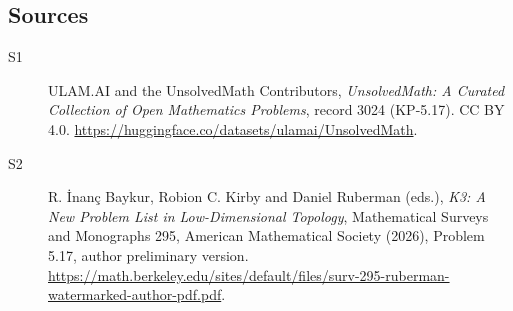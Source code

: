 \documentclass[11pt]{article}
\begin{document}
\subsection{Sources}
\begin{description}
\item[\hypertarget{source:3024:1}{S1}] ULAM.AI and the UnsolvedMath Contributors, \emph{UnsolvedMath: A Curated Collection of Open Mathematics Problems}, record 3024 (KP-5.17). CC BY 4.0. \url{https://huggingface.co/datasets/ulamai/UnsolvedMath}.
\item[\hypertarget{source:3024:2}{S2}] R. İnanç Baykur, Robion C. Kirby and Daniel Ruberman (eds.), \emph{K3: A New Problem List in Low-Dimensional Topology}, Mathematical Surveys and Monographs 295, American Mathematical Society (2026), Problem 5.17, author preliminary version. \url{https://math.berkeley.edu/sites/default/files/surv-295-ruberman-watermarked-author-pdf.pdf}.
\end{description}
\label{end:3024}
\end{document}

